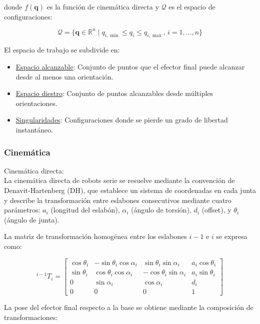 donde $f(\mathbf{q})$ es la función de cinemática directa y $\mathcal{Q}$ es el espacio de configuraciones:

\begin{equation}
\mathcal{Q} = \{\mathbf{q} \in \mathbb{R}^n \mid q_{i,\min} \leq q_i \leq q_{i,\max}, \, i = 1, \ldots, n\}
\end{equation}

El espacio de trabajo se subdivide en:

\begin{itemize}[label=$\bullet$]
    \item \underline{Espacio alcanzable}: Conjunto de puntos que el efector final puede alcanzar desde al menos una orientación.
    \item \underline{Espacio diestro}: Conjunto de puntos alcanzables desde múltiples orientaciones.
    \item \underline{Singularidades}: Configuraciones donde se pierde un grado de libertad instantáneo.
\end{itemize}

\subsubsection{Cinemática}

Cinemática directa:\\
\noindent
La cinemática directa de robots serie se resuelve mediante la convención de Denavit-Hartenberg (DH), que establece un sistema de coordenadas en cada junta y describe la transformación entre eslabones consecutivos mediante cuatro parámetros: $a_i$ (longitud del eslabón), $\alpha_i$ (ángulo de torsión), $d_i$ (offset), y $\theta_i$ (ángulo de junta).

La matriz de transformación homogénea entre los eslabones $i-1$ e $i$ se expresa como:

\begin{equation}
{}^{i-1}T_i = 
\begin{bmatrix}
\cos\theta_i & -\sin\theta_i\cos\alpha_i & \sin\theta_i\sin\alpha_i & a_i\cos\theta_i \\
\sin\theta_i & \cos\theta_i\cos\alpha_i & -\cos\theta_i\sin\alpha_i & a_i\sin\theta_i \\
0 & \sin\alpha_i & \cos\alpha_i & d_i \\
0 & 0 & 0 & 1
\end{bmatrix}
\end{equation}

La pose del efector final respecto a la base se obtiene mediante la composición de transformaciones:

